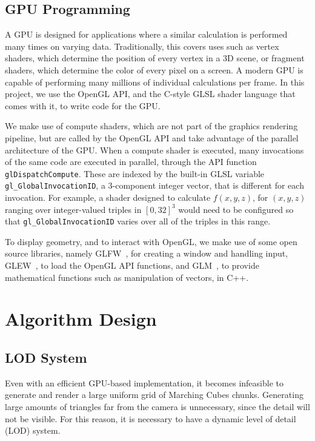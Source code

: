 \documentclass[11pt]{article}
\begin{document}
\subsection{GPU Programming} 
A GPU is designed for applications where a similar calculation is performed many times on varying data. Traditionally, this covers uses such as vertex shaders, which determine the position of every vertex in a 3D scene, or fragment shaders, which determine the color of every pixel on a screen. A modern GPU is capable of performing many millions of individual calculations per frame. In this project, we use the OpenGL API, and the C-style GLSL shader language that comes with it, to write code for the GPU.

We make use of compute shaders, which are not part of the graphics rendering pipeline, but are called by the OpenGL API and take advantage of the parallel architecture of the GPU. When a compute shader is executed, many invocations of the same code are executed in parallel, through the API function \texttt{glDispatchCompute}. These are indexed by the built-in GLSL variable \texttt{gl\_GlobalInvocationID}, a 3-component integer vector, that is different for each invocation. For example, a shader designed to calculate $f\left(x,y,z\right)$, for $ \left(x,y,z\right)$ ranging over integer-valued triples in $\left[0,32\right]^3$ would need to be configured so that \texttt{gl\_GlobalInvocationID} varies over all of the triples in this range.

To display geometry, and to interact with OpenGL, we make use of some open source libraries, namely GLFW~\cite{glfw}, for creating a window and handling input, GLEW~\cite{glew}, to load the OpenGL API functions, and GLM~\cite{g-truc_2005}, to provide mathematical functions such as manipulation of vectors, in C++.


\section{Algorithm Design}

\subsection{LOD System}
Even with an efficient GPU-based implementation, it becomes infeasible to generate and render a large uniform grid of Marching Cubes chunks. Generating large amounts of triangles far from the camera is unnecessary, since the detail will not be visible. For this reason, it is necessary to have a dynamic level of detail (LOD) system.
\end{document}
